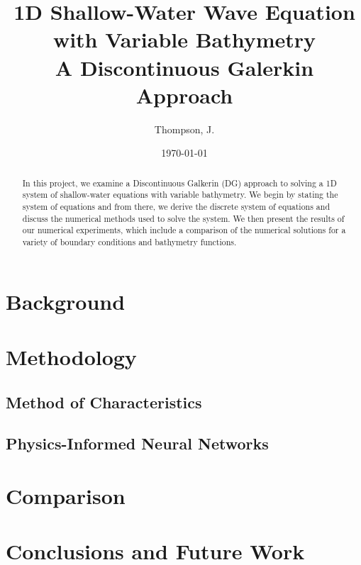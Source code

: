 \documentclass[letterpaper,11pt]{article}
\begin{document}
    \title{%
        1D Shallow-Water Wave Equation with Variable Bathymetry\\
        \large A Discontinuous Galerkin Approach
    }
    \author{%
        Thompson, J.
    }
    \date{\today}
    \maketitle

    \begin{abstract}
        In this project, we examine a Discontinuous Galkerin (DG) approach to solving a 1D system of shallow-water
        equations with variable bathymetry. We begin by stating the system of equations and from there, we derive the 
        discrete system of equations and discuss the numerical methods used to solve the system. We then present the 
        results of our numerical experiments, which include a comparison of the numerical solutions for a variety of
        boundary conditions and bathymetry functions.
    \end{abstract}

    \section{Background}\label{sec:background}

    

    \section{Methodology}\label{sec:proposed-methodology}

    \subsection{Method of Characteristics}\label{subset:moc-methodology}

    

    \subsection{Physics-Informed Neural Networks}\label{subsec:pinn-methodology}

    \section{Comparison}\label{sec:comparison}

    \section{Conclusions and Future Work}\label{sec:conclusion}

    \pagebreak

    
    
\end{document}
